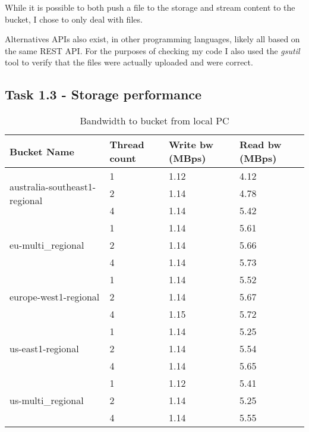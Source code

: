 \documentclass[paper=a4, fontsize=11pt]{scrartcl}
\numberwithin{equation}{section}    %
\numberwithin{figure}{section}      %
\numberwithin{table}{section}       %
\begin{document}
While it is possible to both push a file to the storage and stream content to the bucket, I chose to only deal with files.

Alternatives APIs also exist, in other programming languages, likely all based on the same REST API. For the purposes of checking my code I also used the \textit{gsutil} tool to verify that the files were actually uploaded and were correct.

\subsection{Task 1.3 - Storage performance}

\begin{table}[htb]
\centering
\caption{Bandwidth to bucket from local PC}
\begin{tabular}{|l|l|l|l|}
\hline
Bucket Name                                           & Thread count & Write bw (MBps) & Read bw (MBps) \\ \hline
\multirow{3}{*}{australia-southeast1-regional}        & 1 & 1.12 & 4.12         \\ \cline{2-4} 
                                                      & 2 & 1.14 & 4.78         \\ \cline{2-4} 
                                                      & 4 & 1.14 & 5.42         \\ \hline
\multirow{3}{*}{eu-multi\_regional}                    & 1 & 1.14 & 5.61         \\ \cline{2-4} 
                                                      & 2 & 1.14 & 5.66         \\ \cline{2-4} 
                                                      & 4 & 1.14 & 5.73         \\ \hline
\multirow{3}{*}{europe-west1-regional}                & 1 & 1.14 & 5.52        \\ \cline{2-4} 
                                                      & 2 & 1.14 & 5.67        \\ \cline{2-4} 
                                                      & 4 & 1.15 & 5.72         \\ \hline
\multirow{3}{*}{us-east1-regional}                    & 1 & 1.14 & 5.25         \\ \cline{2-4} 
                                                      & 2 & 1.14 & 5.54        \\ \cline{2-4} 
                                                      & 4 & 1.14 & 5.65         \\ \hline
\multirow{3}{*}{us-multi\_regional}                    & 1 & 1.12 & 5.41         \\ \cline{2-4} 
                                                      & 2 & 1.14 & 5.25         \\ \cline{2-4} 
                                                      & 4 & 1.14 & 5.55         \\ \hline
\end{tabular}
\end{table}
\end{document}
